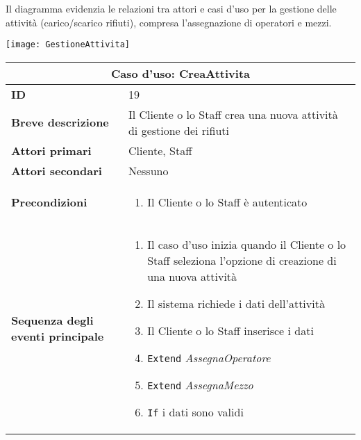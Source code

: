 \documentclass[a4paper]{report}
\begin{document}
\clearpage
{}

Il diagramma evidenzia le relazioni tra attori e casi d’uso per la gestione delle attività (carico/scarico rifiuti), compresa l'assegnazione di operatori e mezzi.

\begin{figure*}[ht]
    \centering
    \texttt{[image: GestioneAttivita]}
\end{figure*}

\clearpage
\begin{table}[H]
\vspace*{-0cm}
\renewcommand{\arraystretch}{1.9}
\begin{tabular}{|p{3.9cm}|p{9.9cm}|}
\hline
\multicolumn{2}{|c|}{\textbf{Caso d’uso: CreaAttivita}} \\ \hline
	\textbf{ID} & 19 \\ \hline
	\textbf{Breve descrizione} & Il Cliente o lo Staff crea una nuova attività di gestione dei rifiuti \\ \hline
	\textbf{Attori primari} & Cliente, Staff \\ \hline
	\textbf{Attori secondari} & Nessuno \\ \hline
	\textbf{Precondizioni} & \begin{enumerate}[leftmargin=14pt,label=\arabic*.,labelsep=0.5em,topsep=0pt,partopsep=0pt,parsep=0pt,itemsep=0pt]
    \item Il Cliente o lo Staff è autenticato
\end{enumerate} \\ \hline
	\textbf{Sequenza degli eventi principale} & \begin{enumerate}[leftmargin=14pt,label=\arabic*.,labelsep=0.5em,topsep=0pt,partopsep=0pt,parsep=0pt,itemsep=0pt]
    \item Il caso d’uso inizia quando il Cliente o lo Staff seleziona l'opzione di creazione di una nuova attività
    \item Il sistema richiede i dati dell’attività
    \item Il Cliente o lo Staff inserisce i dati
    \item \texttt{Extend} \textit{AssegnaOperatore}
    \item \texttt{Extend} \textit{AssegnaMezzo}
    \item \texttt{If} i dati sono validi
    \begin{enumerate}[label=\arabic{enumi}.\arabic*.,leftmargin=22pt,labelsep=0.5em,topsep=0pt,partopsep=0pt,parsep=0pt,itemsep=0pt]

\end{enumerate}
\end{enumerate}
\end{tabular}
\end{table}
\end{document}
